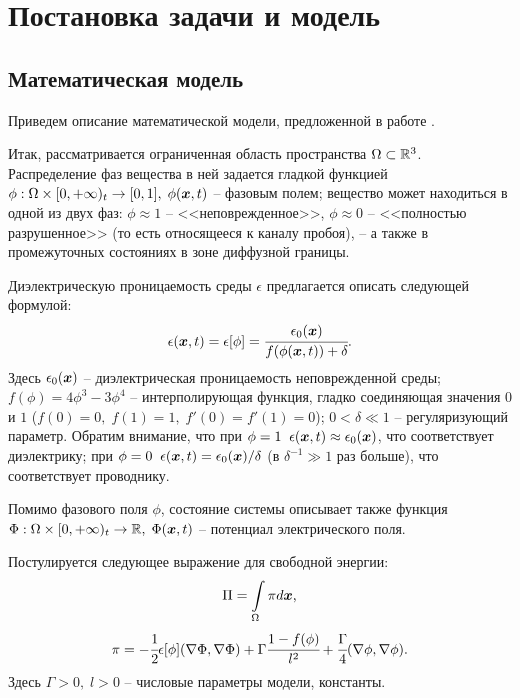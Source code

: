
\section{Постановка задачи и модель}

\subsection{Математическая модель}

Приведем описание математической модели, предложенной в работе \cite{pitike_dielectric_breakdown}.

Итак, рассматривается ограниченная область пространства $\Omega \subset {\mathbb{R}}^3$. Распределение фаз вещества в ней задается гладкой функцией $\phi: \Omega \times [0, +\infty)_t \to [0, 1], \; \phi({\boldsymbol{x}}, t)$ -- фазовым полем; вещество может находиться в одной из двух фаз: $\phi \approx 1$ -- <<неповрежденное>>, $\phi \approx 0$ -- <<полностью разрушенное>> (то есть относящееся к каналу пробоя), -- а также в промежуточных состояниях в зоне диффузной границы.

Диэлектрическую проницаемость среды $\epsilon$ предлагается описать следующей формулой:
\begin{equation}
	\epsilon({\boldsymbol{x}}, t) = \epsilon[\phi] = \cfrac{\epsilon_0({\boldsymbol{x}})}{f(\phi({\boldsymbol{x}}, t)) + \delta} {\text{.}}
	\label{eq:epsilon}
\end{equation}
Здесь $\epsilon_0({\boldsymbol{x}})$ -- диэлектрическая проницаемость неповрежденной среды; $f(\phi) = 4\phi^3 - 3\phi^4$ -- интерполирующая функция, гладко соединяющая значения $0$ и $1$ ($f(0) = 0, \; f(1) = 1, \; f'(0) = f'(1) = 0$); $0 < \delta \ll 1$ -- регуляризующий параметр. Обратим внимание, что при $\phi = 1 \;\; \epsilon({\boldsymbol{x}}, t) \approx \epsilon_0({\boldsymbol{x}})$, что соответствует диэлектрику; при $\phi = 0 \;\; \epsilon({\boldsymbol{x}}, t) = \epsilon_0({\boldsymbol{x}}) / \delta$ (в $\delta^{-1} \gg 1$ раз больше), что соответствует проводнику.

Помимо фазового поля $\phi$, состояние системы описывает также функция $\Phi: \Omega \times [0, +\infty)_t \to {\mathbb{R}}, \; \Phi({\boldsymbol{x}}, t)$ -- потенциал электрического поля.

Постулируется следующее выражение для свободной энергии:
\begin{equation}
	\Pi = \int \limits_\Omega \pi d {\boldsymbol{x}} {\text{,}}
	\label{eq:free_energy}
\end{equation}
\begin{equation}
	\pi = -\cfrac{1}{2} \epsilon[\phi] (\nabla \Phi, \nabla \Phi) + \Gamma \cfrac{1 - f(\phi)}{l^2} + \cfrac{\Gamma}{4} (\nabla \phi, \nabla \phi) {\text{.}}
	\label{eq:free_energy_density}
\end{equation}
Здесь $\Gamma > 0, \; l > 0$ -- числовые параметры модели, константы.


